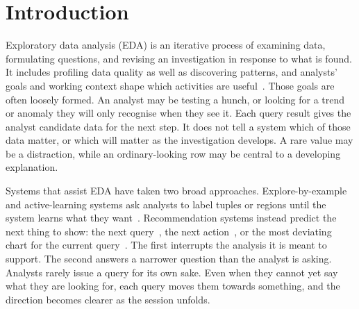 \documentclass[sigconf]{acmart}
\begin{document}

\maketitle

\section{Introduction}
\label{sec:intro}

Exploratory data analysis (EDA) is an iterative process of examining data, formulating questions, and revising an investigation in response to what is found. It includes profiling data quality as well as discovering patterns, and analysts' goals and working context shape which activities are useful~\cite{wongsuphasawat2019edagoals}. Those goals are often loosely formed. An analyst may be testing a hunch, or looking for a trend or anomaly they will only recognise when they see it. Each query result gives the analyst candidate data for the next step. It does not tell a system which of those data matter, or which will matter as the investigation develops. A rare value may be a distraction, while an ordinary-looking row may be central to a developing explanation.

Systems that assist EDA have taken two broad approaches. Explore-by-example and active-learning systems ask analysts to label tuples or regions until the system learns what they want~\cite{dimitriadouAIDEActiveLearningBased2016,qinRankingDesiredTuples2021}. Recommendation systems instead predict the next thing to show: the next query~\cite{eirinakiQuerieCollaborativeDatabase2013}, the next action~\cite{dezoysa2025exploract}, or the most deviating chart for the current query~\cite{vartakSeedbEfficientDatadriven2015}. The first interrupts the analysis it is meant to support. The second answers a narrower question than the analyst is asking. Analysts rarely issue a query for its own sake. Even when they cannot yet say what they are looking for, each query moves them towards something, and the direction becomes clearer as the session unfolds.
\end{document}
